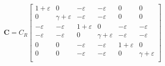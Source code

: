\usepackage{amsmath}

\begin{equation}
\mathbf{C}=C_R
    \begin{bmatrix}
    1+\varepsilon       & 0             & -\varepsilon        & -\varepsilon     & 0              & 0           \\
    0               & \gamma+\varepsilon     & -\varepsilon        & -\varepsilon     & 0              & 0           \\
    -\varepsilon          & -\varepsilon        & 1+\varepsilon     & 0          & -\varepsilon         & -\varepsilon      \\
    -\varepsilon          & -\varepsilon        & 0             & \gamma+\varepsilon  & -\varepsilon         & -\varepsilon      \\
    0               & 0             & -\varepsilon        & -\varepsilon     & 1+\varepsilon      & 0           \\
    0               & 0             & -\varepsilon        & -\varepsilon     &  0             & \gamma+\varepsilon   \\
    \end{bmatrix}
\end{equation}